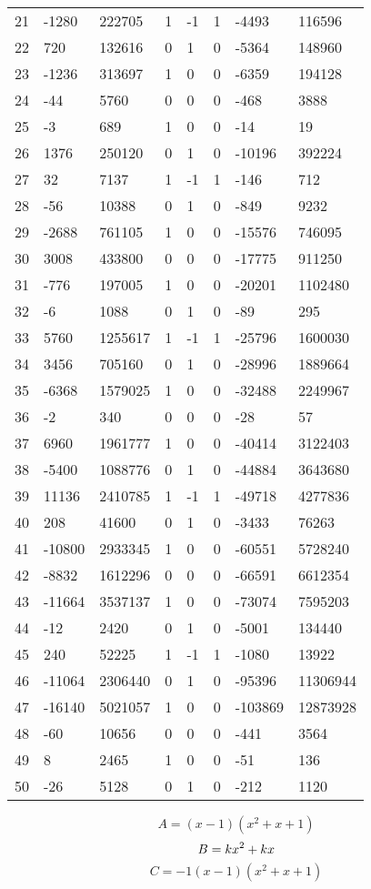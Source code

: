 \documentclass{amsart}
\begin{document}
\begin{longtable}{|l|l|l|lllll|}
21&-1280&222705&1&-1&1&-4493&116596\\
22&720&132616&0&1&0&-5364&148960\\
23&-1236&313697&1&0&0&-6359&194128\\
24&-44&5760&0&0&0&-468&3888\\
25&-3&689&1&0&0&-14&19\\
26&1376&250120&0&1&0&-10196&392224\\
27&32&7137&1&-1&1&-146&712\\
28&-56&10388&0&1&0&-849&9232\\
29&-2688&761105&1&0&0&-15576&746095\\
30&3008&433800&0&0&0&-17775&911250\\
31&-776&197005&1&0&0&-20201&1102480\\
32&-6&1088&0&1&0&-89&295\\
33&5760&1255617&1&-1&1&-25796&1600030\\
34&3456&705160&0&1&0&-28996&1889664\\
35&-6368&1579025&1&0&0&-32488&2249967\\
36&-2&340&0&0&0&-28&57\\
37&6960&1961777&1&0&0&-40414&3122403\\
38&-5400&1088776&0&1&0&-44884&3643680\\
39&11136&2410785&1&-1&1&-49718&4277836\\
40&208&41600&0&1&0&-3433&76263\\
41&-10800&2933345&1&0&0&-60551&5728240\\
42&-8832&1612296&0&0&0&-66591&6612354\\
43&-11664&3537137&1&0&0&-73074&7595203\\
44&-12&2420&0&1&0&-5001&134440\\
45&240&52225&1&-1&1&-1080&13922\\
46&-11064&2306440&0&1&0&-95396&11306944\\
47&-16140&5021057&1&0&0&-103869&12873928\\
48&-60&10656&0&0&0&-441&3564\\
49&8&2465&1&0&0&-51&136\\
50&-26&5128&0&1&0&-212&1120\\
\hline
\end{longtable}
$$A=(x
 - 1)(x^2
 + x
 + 1)$$
$$B=k\*x^2
 + k\*x$$
$$C=-1(x
 - 1)(x^2
 + x
 + 1)$$
\end{document}
